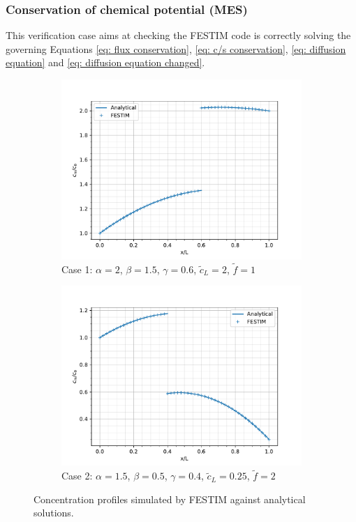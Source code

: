 \subsubsection{Conservation of chemical potential (MES)}
This verification case aims at checking the FESTIM code is correctly solving the governing Equations \ref{eq: flux conservation}, \ref{eq: c/s conservation}, \ref{eq: diffusion equation} and \ref{eq: diffusion equation changed}.

\begin{figure} [h]
    \centering
    \begin{subfigure}{0.5\linewidth}
        \centering
        \includegraphics[width=\linewidth]{Figures/Chapter3/monoblocks/interface_condition/out_MES_case1.pdf}
        \caption{Case 1: $\alpha = 2$, $\beta = 1.5$, $\gamma=0.6$, $\tilde{c}_L = 2$, $\tilde{f}=1$}
    \end{subfigure}%
    \begin{subfigure}{0.5\linewidth}
        \centering
        \includegraphics[width=\linewidth]{Figures/Chapter3/monoblocks/interface_condition/out_MES_case2.pdf}
        \caption{Case 2:  $\alpha = 1.5$, $\beta = 0.5$, $\gamma=0.4$, $\tilde{c}_L = 0.25$, $\tilde{f}=2$}
    \end{subfigure}
    \caption{Concentration profiles simulated by FESTIM against analytical solutions.}
    \label{fig:comparison MES}
\end{figure}

